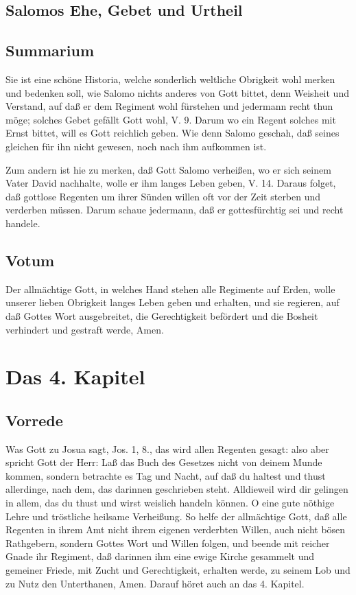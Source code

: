 \section{Salomos Ehe, Gebet und Urtheil}

\section{Summarium}

Sie ist eine schöne Historia, welche sonderlich weltliche Obrigkeit wohl merken und bedenken soll, wie Salomo nichts anderes von Gott bittet, denn Weisheit und Verstand, auf daß er dem Regiment wohl fürstehen und jedermann recht thun möge; solches Gebet gefällt Gott wohl, V. 9. Darum wo ein Regent solches mit Ernst bittet, will es Gott reichlich geben. Wie denn Salomo geschah, daß seines gleichen für ihn nicht gewesen, noch nach ihm aufkommen ist.

Zum andern ist hie zu merken, daß Gott Salomo verheißen, wo er sich seinem Vater David nachhalte, wolle er ihm langes Leben geben, V. 14. Daraus folget, daß gottlose Regenten um ihrer Sünden willen oft vor der Zeit sterben und verderben müssen. Darum schaue jedermann, daß er gottesfürchtig sei und recht handele.

\section{Votum}

Der allmächtige Gott, in welches Hand stehen alle Regimente auf Erden, wolle unserer lieben Obrigkeit langes Leben geben und erhalten, und sie regieren, auf daß Gottes Wort ausgebreitet, die Gerechtigkeit befördert und die Bosheit verhindert und gestraft werde, Amen.

\chapter{Das 4. Kapitel}

\section{Vorrede}

Was Gott zu Josua sagt, Jos. 1, 8., das wird allen Regenten gesagt: also aber spricht Gott der Herr: Laß das Buch des Gesetzes nicht von deinem Munde kommen, sondern betrachte es Tag und Nacht, auf daß du haltest und thust allerdinge, nach dem, das darinnen geschrieben steht. Alldieweil wird dir gelingen in allem, das du thust und wirst weislich handeln können. O eine gute nöthige Lehre und tröstliche heilsame Verheißung. So helfe der allmächtige Gott, daß alle Regenten in ihrem Amt nicht ihrem eigenen verderbten Willen, auch nicht bösen Rathgebern, sondern Gottes Wort und Willen folgen, und beende mit reicher Gnade ihr Regiment, daß darinnen ihm eine ewige Kirche gesammelt und gemeiner Friede, mit Zucht und Gerechtigkeit, erhalten werde, zu seinem Lob und zu Nutz den Unterthanen, Amen. Darauf höret auch an das 4. Kapitel.


